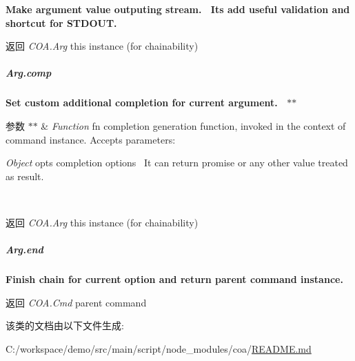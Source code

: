 {\bfseries {\bfseries {\bfseries {\bfseries {\bfseries {\bfseries {\bfseries {\bfseries {\bfseries  Make argument value outputing stream.~\newline
 It\textquotesingle{}s add useful validation and shortcut for S\+T\+D\+O\+UT.~\newline
 {\bfseries \begin{DoxyReturn}{返回}
{\itshape C\+O\+A.\+Arg} {\ttfamily this} instance (for chainability)
\end{DoxyReturn}
\subparagraph*{Arg.\+comp}}}}}}}}}}}

{\bfseries {\bfseries {\bfseries {\bfseries {\bfseries {\bfseries {\bfseries {\bfseries {\bfseries {\bfseries  Set custom additional completion for current argument.~\newline
 $\ast$$\ast$
\begin{DoxyParams}{参数}
{\em $\ast$$\ast$} & {\itshape Function} {\ttfamily fn} completion generation function, invoked in the context of command instance. Accepts parameters\+:~\newline

\begin{DoxyItemize}
\item {\itshape Object} {\ttfamily opts} completion options~\newline
 It can return promise or any other value treated as result.~\newline
 {\bfseries }
\end{DoxyItemize}\\
\hline
\end{DoxyParams}
\begin{DoxyReturn}{返回}
{\bfseries } {\itshape C\+O\+A.\+Arg} {\ttfamily this} instance (for chainability)
\end{DoxyReturn}
\subparagraph*{Arg.\+end}}}}}}}}}}}

{\bfseries {\bfseries {\bfseries {\bfseries {\bfseries {\bfseries {\bfseries {\bfseries {\bfseries {\bfseries  Finish chain for current option and return parent command instance.~\newline
 {\bfseries \begin{DoxyReturn}{返回}
{\itshape C\+O\+A.\+Cmd} {\ttfamily parent} command 
\end{DoxyReturn}
}}}}}}}}}}}

该类的文档由以下文件生成\+:\begin{DoxyCompactItemize}
\item 
C\+:/workspace/demo/src/main/script/node\+\_\+modules/coa/\mbox{\hyperlink{node__modules_2coa_2_r_e_a_d_m_e_8md}{R\+E\+A\+D\+M\+E.\+md}}\end{DoxyCompactItemize}

